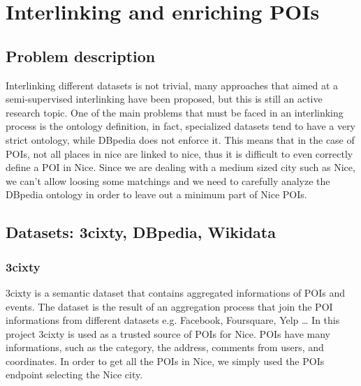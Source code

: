 \documentclass[paper=a4, fontsize=11pt]{scrartcl}
\begin{document}
\section{Interlinking and enriching POIs}
\subsection{Problem description}
Interlinking different datasets is not trivial, many approaches that aimed at a semi-supervised interlinking have been proposed, but this is still an active research topic.
One of the main problems that must be faced in an interlinking process is the ontology definition, in fact, specialized datasets tend to have a very strict ontology, while DBpedia does not enforce it. This means that in the case of POIs, not all places in nice are linked to nice, thus it is difficult to even correctly define a POI in Nice.
Since we are dealing with a medium sized city such as Nice, we can't allow loosing some matchings and we need to carefully analyze the DBpedia ontology in order to leave out a minimum part of Nice POIs.

\subsection{Datasets: 3cixty, DBpedia, Wikidata}
\subsubsection{3cixty}
3cixty is a semantic dataset that contains aggregated informations of POIs and events. The dataset is the result of an aggregation process that join the POI informations from different datasets e.g. Facebook, Foursquare, Yelp \dots
In this project 3cixty is used as a trusted source of POIs for Nice.
POIs have many informations, such as the category, the address, comments from users, and coordinates. In order to get all the POIs in Nice, we simply used the POIs endpoint selecting the Nice city.
\end{document}
